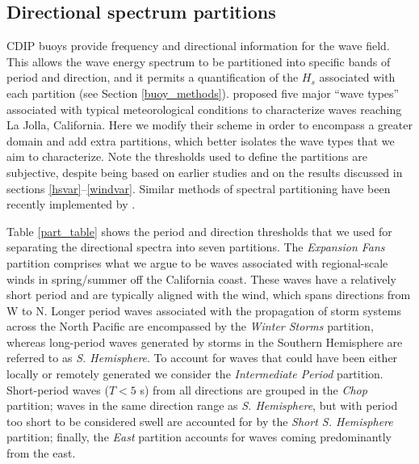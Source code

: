 \subsection{Directional spectrum partitions}\label{dirspec}
CDIP buoys provide frequency and directional information for the wave field. This allows the wave energy spectrum to be partitioned into specific bands of period and direction, and it permits a quantification of the $H_s$ associated with each partition (see Section \ref{buoy_methods}). 
\cite{munk1947refraction} proposed five major ``wave types'' associated with typical meteorological conditions to characterize waves reaching La Jolla, California. Here we modify their scheme in order to encompass a greater domain and add extra partitions, which better isolates the wave types that we aim to characterize. Note the thresholds used to define the partitions are subjective, despite being based on earlier studies \citep[e.g.,][]{munk1947refraction, adams2008southern} and on the results discussed in sections \ref{hsvar}--\ref{windvar}. Similar methods of spectral partitioning have been recently implemented by \cite{portilla2016climate}.

Table \ref{part_table} shows the period and direction thresholds that we used for separating the directional spectra into seven partitions. The \textit{Expansion Fans} partition comprises what we argue to be waves associated with regional-scale winds in spring/summer off the California coast. These waves have a relatively short period and are typically aligned with the wind, which spans directions from W to N. Longer period waves associated with the propagation of storm systems across the North Pacific are encompassed by the \textit{Winter Storms} partition, whereas long-period waves generated by storms in the Southern Hemisphere are referred to as \textit{S. Hemisphere}. To account for waves that could have been either locally or remotely generated we consider the \textit{Intermediate Period} partition. Short-period waves ($T < 5$ s) from all directions are grouped in the \textit{Chop} partition; waves in the same direction range as \textit{S. Hemisphere}, but with period too short to be considered swell are accounted for by the \textit{Short S. Hemisphere} partition; finally, the \textit{East} partition accounts for waves coming predominantly from the east.       

